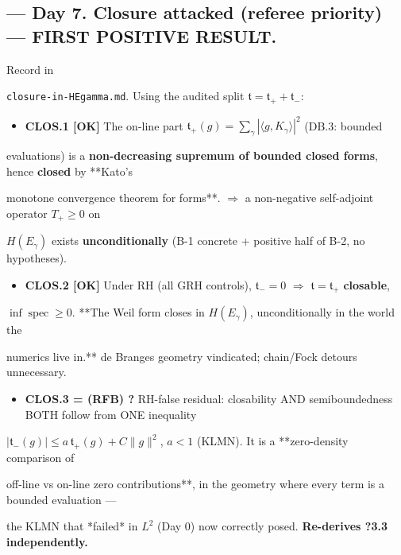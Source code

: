 \documentclass[10pt]{article}
\begin{document}
\subsection*{ --- Day 7. Closure attacked (referee priority) --- FIRST POSITIVE RESULT.}
Record in\par
\texttt{closure-in-HEgamma.md}. Using the audited split $\mathfrak t=\mathfrak t_++\mathfrak t_-$:\par
\begin{itemize}
\item \textbf{CLOS.1 [OK]} The on-line part $\mathfrak t_+(g)=\sum_\gamma|\langle g,K_\gamma\rangle|^2$ (DB.3: bounded
\end{itemize}
  evaluations) is a \textbf{non-decreasing supremum of bounded closed forms}, hence \textbf{closed} by **Kato's\par
  monotone convergence theorem for forms**. \ensuremath{\Rightarrow} a non-negative self-adjoint operator $T_+\ge0$ on\par
  $H(E_\gamma)$ exists \textbf{unconditionally} (B-1 concrete + positive half of B-2, no hypotheses).\par
\begin{itemize}
\item \textbf{CLOS.2 [OK]} Under RH (all GRH controls), $\mathfrak t_-=0$ \ensuremath{\Rightarrow} $\mathfrak t=\mathfrak t_+$ \textbf{closable},
\end{itemize}
  $\inf\operatorname{spec}\ge0$. **The Weil form closes in $H(E_\gamma)$, unconditionally in the world the\par
  numerics live in.** de Branges geometry vindicated; chain/Fock detours unnecessary.\par
\begin{itemize}
\item \textbf{CLOS.3 = (RFB) ?} RH-false residual: closability AND semiboundedness BOTH follow from ONE inequality
\end{itemize}
  $|\mathfrak t_-(g)|\le a\,\mathfrak t_+(g)+C\|g\|^2$, $a<1$ (KLMN). It is a **zero-density comparison of\par
  off-line vs on-line zero contributions**, in the geometry where every term is a bounded evaluation ---\par
  the KLMN that *failed* in $L^2$ (Day 0) now correctly posed. \textbf{Re-derives ?3.3 independently.}\par
\end{document}
